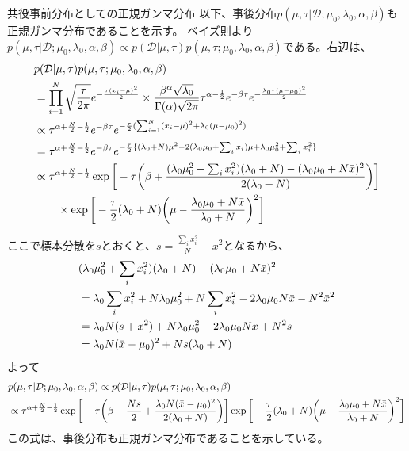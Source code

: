 \documentclass[aspectratio=169,unicode,dvipdfmx,14pt]{beamer}
\begin{document}
\begin{frame}{共役事前分布としての正規ガンマ分布}
\FontMath
以下、事後分布$p(\mu,\tau|\mathcal{D};\mu_0, \lambda_0, \alpha, \beta)$も正規ガンマ分布であることを示す。
ベイズ則より$p(\mu,\tau|\mathcal{D};\mu_0, \lambda_0, \alpha, \beta)
\propto p(\mathcal{D}|\mu,\tau) p(\mu, \tau ; \mu_0, \lambda_0, \alpha, \beta)$である。右辺は、
\begin{align}
& p(\mathcal{D}|\mu,\tau) p(\mu, \tau ; \mu_0, \lambda_0, \alpha, \beta)
\notag \\ & =
\prod_{i=1}^N \sqrt{\frac{\tau}{2\pi}}e^{ - \frac{  \tau(x_i - \mu)^2 }{2} }
\times
\frac{\beta^\alpha\sqrt{\lambda_0}}{\Gamma(\alpha)\sqrt{2\pi}}
\tau^{\alpha-\frac{1}{2}}e^{-\beta\tau}e^{-\frac{\lambda_0\tau(\mu - \mu_0)^2}{2}}
\notag \\ & \propto
\tau^{\alpha + \frac{N}{2} - \frac{1}{2}}e^{-\beta\tau}
e^{ - \frac{\tau}{2} ( \sum_{i=1}^N (x_i - \mu)^2 + \lambda_0(\mu - \mu_0)^2) }
\notag \\ & =
\tau^{\alpha + \frac{N}{2} - \frac{1}{2}}e^{-\beta\tau}
e^{ - \frac{\tau}{2} \{ ( \lambda_0 + N ) \mu^2 - 2 ( \lambda_0 \mu_0 + \sum_i x_i) \mu + \lambda_0 \mu_0^2 + \sum_i x_i^2 \} }
\notag \\ & \propto
\tau^{\alpha + \frac{N}{2} - \frac{1}{2}}
\exp \bigg[ - \tau \bigg( \beta + \frac{ (\lambda_0 \mu_0^2 + \sum_i x_i^2)( \lambda_0 + N )
- ( \lambda_0 \mu_0 + N\bar{x} )^2 }{ 2( \lambda_0 + N ) }
\bigg) \bigg]
\notag \\ & \mbox{ \hspace{ .2in} }
\times \exp \bigg[ - \frac{\tau}{2} ( \lambda_0 + N ) \bigg( \mu - \frac{ \lambda_0 \mu_0 + N\bar{x} }{ \lambda_0 + N } \bigg)^2 \bigg]
\end{align}
\end{frame}

\begin{frame}
\FontMath
ここで標本分散を$s$とおくと、$s = \frac{\sum_i x_i^2}{N} - \bar{x}^2$となるから、
\begin{align}
& (\lambda_0 \mu_0^2 + \sum_i x_i^2)( \lambda_0 + N )
- ( \lambda_0 \mu_0 + N\bar{x} )^2
\notag \\ & =
\lambda_0 \sum_i x_i^2 + N \lambda_0 \mu_0^2 + N \sum_i x_i^2
- 2 \lambda_0 \mu_0 N\bar{x} - N^2 \bar{x}^2
\notag \\ & =
\lambda_0 N ( s + \bar{x}^2 )
+ N \lambda_0 \mu_0^2 - 2 \lambda_0 \mu_0 N\bar{x} + N^2 s
\notag \\ & =
\lambda_0 N (\bar{x} - \mu_0)^2 + Ns(\lambda_0 + N)
\end{align}
よって
\begin{align}
& p(\mu,\tau|\mathcal{D};\mu_0, \lambda_0, \alpha, \beta)
\propto p(\mathcal{D}|\mu,\tau) p(\mu, \tau ; \mu_0, \lambda_0, \alpha, \beta)
\notag \\ & \propto
\tau^{\alpha + \frac{N}{2} - \frac{1}{2}}
\exp \bigg[ - \tau \bigg( \beta + \frac{Ns}{2} + \frac{ \lambda_0 N (\bar{x} - \mu_0)^2 }{ 2( \lambda_0 + N ) }
\bigg) \bigg]
\exp \bigg[ - \frac{\tau}{2} ( \lambda_0 + N ) \bigg( \mu - \frac{ \lambda_0 \mu_0 + N\bar{x} }{ \lambda_0 + N } \bigg)^2 \bigg]
\end{align}
この式は、事後分布も正規ガンマ分布であることを示している。
\end{frame}
\end{document}
